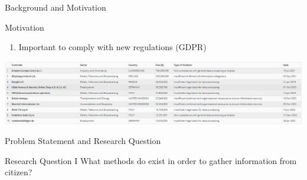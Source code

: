 \documentclass{beamer}
\begin{document}
\begin{frame}{Background and Motivation}
	\begin{block}{Motivation}
		\begin{enumerate}[]
			\item Important to comply with new regulations (GDPR)
		\end{enumerate}
	\end{block}
	\begin{adjustwidth}{-2em}{}
		\includegraphics[scale=0.3]{Enforcement_Tracker_Fines.png}
	\end{adjustwidth}	
\end{frame}

\begin{frame}{Problem Statement and Research Question}
	\begin{block}{Research Question I}
		What methods do exist in order to gather information from citizen?
	\end{block}
\end{frame}
\end{document}
